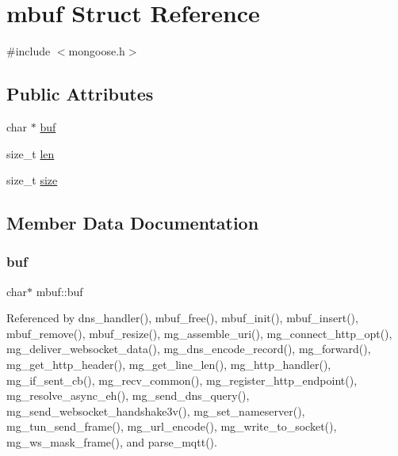\hypertarget{structmbuf}{}\section{mbuf Struct Reference}
\label{structmbuf}


{\ttfamily \#include $<$mongoose.\+h$>$}

\subsection*{Public Attributes}
\begin{DoxyCompactItemize}
\item 
char $\ast$ \hyperlink{structmbuf_ae2a6e23a4997e9aea0908628db2b23d0_ae2a6e23a4997e9aea0908628db2b23d0}{buf}
\item 
size\+\_\+t \hyperlink{structmbuf_a4da00860609dd46fe8b679d5e1deeac3_a4da00860609dd46fe8b679d5e1deeac3}{len}
\item 
size\+\_\+t \hyperlink{structmbuf_ae245d03a50c2891c1fb228093d842270_ae245d03a50c2891c1fb228093d842270}{size}
\end{DoxyCompactItemize}


\subsection{Member Data Documentation}
\mbox{\label{structmbuf_ae2a6e23a4997e9aea0908628db2b23d0_ae2a6e23a4997e9aea0908628db2b23d0}} 
\subsubsection{\texorpdfstring{buf}{buf}}
{\footnotesize\ttfamily char$\ast$ mbuf\+::buf}



Referenced by dns\+\_\+handler(), mbuf\+\_\+free(), mbuf\+\_\+init(), mbuf\+\_\+insert(), mbuf\+\_\+remove(), mbuf\+\_\+resize(), mg\+\_\+assemble\+\_\+uri(), mg\+\_\+connect\+\_\+http\+\_\+opt(), mg\+\_\+deliver\+\_\+websocket\+\_\+data(), mg\+\_\+dns\+\_\+encode\+\_\+record(), mg\+\_\+forward(), mg\+\_\+get\+\_\+http\+\_\+header(), mg\+\_\+get\+\_\+line\+\_\+len(), mg\+\_\+http\+\_\+handler(), mg\+\_\+if\+\_\+sent\+\_\+cb(), mg\+\_\+recv\+\_\+common(), mg\+\_\+register\+\_\+http\+\_\+endpoint(), mg\+\_\+resolve\+\_\+async\+\_\+eh(), mg\+\_\+send\+\_\+dns\+\_\+query(), mg\+\_\+send\+\_\+websocket\+\_\+handshake3v(), mg\+\_\+set\+\_\+nameserver(), mg\+\_\+tun\+\_\+send\+\_\+frame(), mg\+\_\+url\+\_\+encode(), mg\+\_\+write\+\_\+to\+\_\+socket(), mg\+\_\+ws\+\_\+mask\+\_\+frame(), and parse\+\_\+mqtt().

